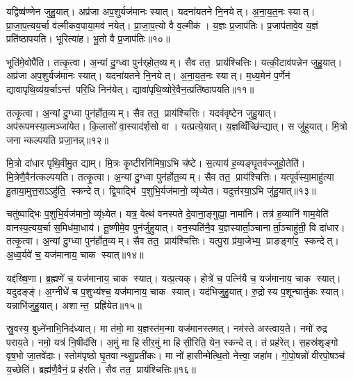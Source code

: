 यद्विष्ष॑ण्णेन जुहु॒यात्। अप्र॑जा अप॒शुर्यज॑मानः स्यात्। यदना॑यतने नि॒नयेत्। अ॒ना॒य॒त॒नः स्यात्। प्रा॒जा॒प॒त्यय॒र्चा व॑ल्मीकव॒पाया॒मव॑ नयेत्। प्रा॒जा॒प॒त्यो वै व॒ल्मीक॑। य॒ज्ञः प्र॒जाप॑तिः। प्र॒जाप॑तावे॒व य॒ज्ञं प्रति॑ष्ठापयति। भूरित्या॑ह। भू॒तो वै प्र॒जाप॑तिः॥१०॥

भूति॑मे॒वोपै॑ति। तत्कृ॒त्वा। अ॒न्यां दु॒ग्ध्वा पुन॑र्‌होत॒व्यम्। सैव तत॒ प्राय॑श्चित्तिः। यत्की॒टाव॑पन्नेन जुहु॒यात्। अप्र॑जा अप॒शुर्यज॑मानः स्यात्। यदना॑यतने नि॒नयेत्। अ॒ना॒य॒त॒नः स्यात्। म॒ध्य॒मेन॑ प॒र्णेन॑ द्यावापृथि॒व्य॑य॒र्चाऽन्त॑ परि॒धि निन॑येत्। द्यावा॑पृथि॒व्योरे॒वैन॒त्प्रति॑ष्ठापयति॥११॥

तत्कृ॒त्वा। अ॒न्यां दु॒ग्ध्वा पुन॑र्\mbox{}होत॒व्यम्। सैव तत॒ प्राय॑श्चित्तिः। यदव॑वृष्टेन जुहु॒यात्। अप॑रूपमस्या॒त्मञ्जा॑येत। कि॒लासो॑ वा॒स्याद॑र्\mbox{}श॒सो वा। यत्प्रत्ये॒यात्। य॒ज्ञव्विँच्छि॑न्द्यात्। स जु॑हुयात्। मि॒त्रो जनान्कल्पयति प्रजा॒नन्न्॥१२॥

मि॒त्रो दा॑धार पृथि॒वीमु॒त द्याम्। मि॒त्रः कृ॒ष्टीरनि॑मिषा॒ऽभि च॑ष्टे। स॒त्याय॑ ह॒व्यङ्घृ॒तव॑ज्जुहो॒तेति॑। मि॒त्रेणै॒वैन॑त्कल्पयति। तत्कृ॒त्वा। अ॒न्यां दु॒ग्ध्वा पुन॑र्\mbox{}होत॒व्यम्। सैव तत॒ प्राय॑श्चित्तिः। यत्पूर्व॑स्या॒माहु॑त्या हु॒ताया॒मुत्त॒राऽऽहु॑ति॒ स्कन्देत्। द्वि॒पाद्भि॑ प॒शुभि॒र्यज॑मानो॒ व्यृ॑ध्येत। यदुत्त॑रया॒ऽभि जु॑हु॒यात्॥१३॥

चतु॑ष्पाद्भिः प॒शुभि॒र्यज॑मानो॒ व्यृ॑ध़्येत। यत्र॒ वेत्थ॑ वनस्पते दे॒वाना॒ङ्गुह्या॒ नामा॑नि। तत्र॑ ह॒व्यानि॑ गाम॒येति॑ वानस्प॒त्यय॒र्चा स॒मिध॑मा॒धाय॑। तू॒ष्णीमे॒व पुन॑र्जुहुयात्। वन॒स्पति॑नै॒व य॒ज्ञस्यार्ता॒ञ्चानार्ता॒ञ्चाहु॑ती॒ वि दा॑धार। तत्कृ॒त्वा। अ॒न्यां दु॒ग्ध्वा पुन॑र्\mbox{}होत॒व्यम्। सैव तत॒ प्राय॑श्चित्तिः। यत्पु॒रा प्र॑या॒जेभ्य॒ प्राङङ्गा॑र॒ स्कन्देत्। अ॒ध्व॒र्यवे॑ च॒ यज॑मानाय॒ चाक स्यात्॥१४॥

यद्द॑ख्षि॒णा। ब्र॒ह्मणे॑ च॒ यज॑मानाय॒ चाक स्यात्। यत्प्र॒त्यक्। होत्रे॑ च॒ पत्नि॑यै च॒ यज॑मानाय॒ चाक स्यात्। यदुदङ्ङ्॑। अ॒ग्नीधे॑ च प॒शुभ्य॑श्च॒ यज॑मानाय॒ चाक स्यात्। यद॑भिजुहु॒यात्। रु॒द्रोस्य प॒शून्घातु॑कः स्यात्। यन्नाभि॑जुहु॒यात्। अशान्त॒ प्रह्रि॑येत॥१५॥

स्रु॒वस्य॒ बुध्ने॑नाभि॒निद॑ध्यात्। मा त॑मो॒ मा य॒ज्ञस्त॑म॒न्मा यज॑मानस्तमत्। नम॑स्ते अस्त्वाय॒ते। नमो॑ रुद्र पराय॒ते। नमो॒ यत्र॑ नि॒षीद॑सि। अ॒मुं मा हिसीर॒मुं मा हिसी॒रिति॒ येन॒ स्कन्देत्। तं प्रह॑रेत्। स॒हस्र॑शृङ्गो वृष॒भो जा॒तवे॑दाः। स्तोम॑पृष्ठो घृ॒तवान्थ्सु॒प्रती॑कः। मा नो॑ हासीन्मेत्थि॒तो नेत्त्वा॒ जहा॑म। गो॒पो॒षन्नो॑ वीरपो॒षञ्च॑ य॒च्छेति॑। ब्रह्म॑णै॒वैनं॒ प्र ह॑रति। सैव तत॒ प्राय॑श्चित्तिः॥१६॥

